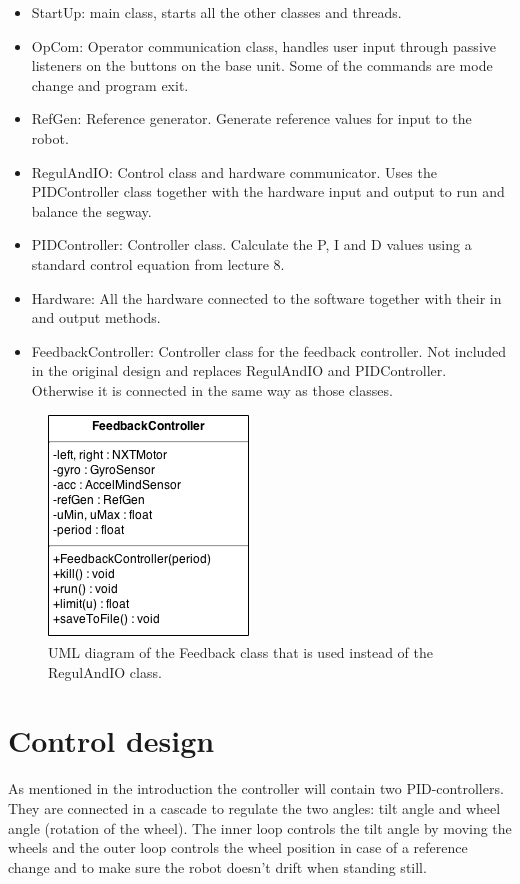 \documentclass[a4paper]{article}
\begin{document}
\begin{itemize}
\item StartUp: main class, starts all the other classes and threads.
\item OpCom: Operator communication class, handles user input through passive listeners on the buttons on the base unit. Some of the commands are mode change and program exit.
\item RefGen: Reference generator. Generate reference values for input to the robot.
\item RegulAndIO: Control class and hardware communicator. Uses the PIDController class together with the hardware input and output to run and balance the segway.
\item PIDController: Controller class. Calculate the P, I and D values using a standard control equation from lecture 8\cite{L8}.
\item Hardware: All the hardware connected to the software together with their in and output methods.
\item FeedbackController: Controller class for the feedback controller. Not included in the original design and replaces RegulAndIO and PIDController. Otherwise it is connected in the same way as those classes.
\end{itemize}

\begin{figure}[H]
 \centering
\includegraphics[scale=0.8]{pic/OnlyFeedback.png}
\caption{UML diagram of the Feedback class that is used instead of the RegulAndIO class.}
\end{figure}

\section{Control design}
As mentioned in the introduction the controller will contain two PID-controllers. They are connected in a cascade to regulate the two angles: tilt angle and wheel angle (rotation of the wheel). The inner loop controls the tilt angle by moving the wheels and the outer loop controls the wheel position in case of a reference change and to make sure the robot doesn't drift when standing still.
\end{document}
